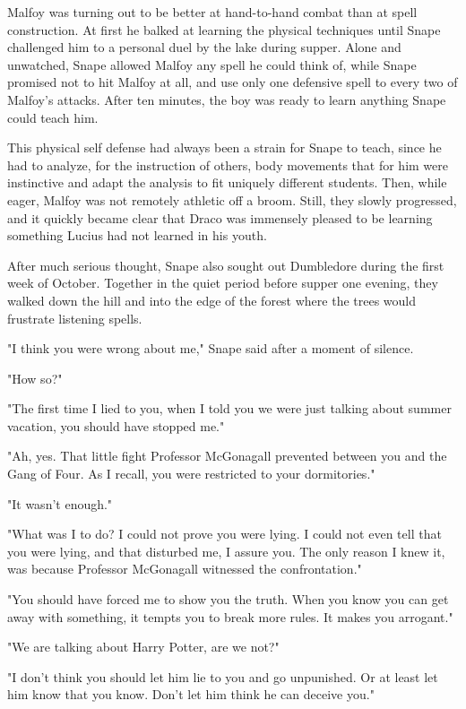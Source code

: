 Malfoy was turning out to be better at hand-to-hand combat than at spell construction. At first he balked at learning the physical techniques until Snape challenged him to a personal duel by the lake during supper. Alone and unwatched, Snape allowed Malfoy any spell he could think of, while Snape promised not to hit Malfoy at all, and use only one defensive spell to every two of Malfoy's attacks. After ten minutes, the boy was ready to learn anything Snape could teach him.

This physical self defense had always been a strain for Snape to teach, since he had to analyze, for the instruction of others, body movements that for him were instinctive and adapt the analysis to fit uniquely different students. Then, while eager, Malfoy was not remotely athletic off a broom. Still, they slowly progressed, and it quickly became clear that Draco was immensely pleased to be learning something Lucius had not learned in his youth.

After much serious thought, Snape also sought out Dumbledore during the first week of October. Together in the quiet period before supper one evening, they walked down the hill and into the edge of the forest where the trees would frustrate listening spells.

"I think you were wrong about me," Snape said after a moment of silence.

"How so?"

"The first time I lied to you, when I told you we were just talking about summer vacation, you should have stopped me."

"Ah, yes. That little fight Professor McGonagall prevented between you and the Gang of Four. As I recall, you were restricted to your dormitories."

"It wasn't enough."

"What was I to do? I could not prove you were lying. I could not even tell that you were lying, and that disturbed me, I assure you. The only reason I knew it, was because Professor McGonagall witnessed the confrontation."

"You should have forced me to show you the truth. When you know you can get away with something, it tempts you to break more rules. It makes you arrogant."

"We are talking about Harry Potter, are we not?"

"I don't think you should let him lie to you and go unpunished. Or at least let him know that you know. Don't let him think he can deceive you."

